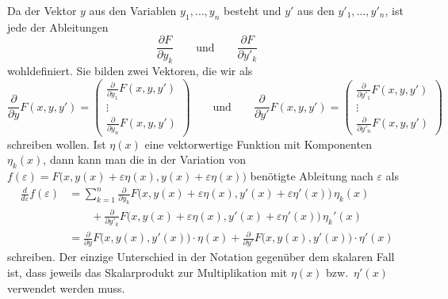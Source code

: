 Da der Vektor $y$ aus den Variablen $y_1,\dots,y_n$ besteht und $y'$
aus den $y'_1,\dots,y'_n$, ist jede der Ableitungen
\[
\frac{\partial F}{\partial y_k}
\qquad\text{und}\qquad
\frac{\partial F}{\partial y'_k}
\]
wohldefiniert.
Sie bilden zwei Vektoren, die wir als
\begin{equation}
\frac{\partial}{\partial y}
F(x,y,y')
=
\begin{pmatrix}
\displaystyle
\frac{\partial}{\partial y_1}F(x,y,y')\\
\vdots\\
\displaystyle
\frac{\partial}{\partial y_n}F(x,y,y')
\end{pmatrix}
\qquad\text{und}\qquad
\frac{\partial}{\partial y'} F(x,y,y')
=
\begin{pmatrix}
\displaystyle
\frac{\partial}{\partial y'_1}F(x,y,y')\\
\vdots\\
\displaystyle
\frac{\partial}{\partial y'_n}F(x,y,y')
\end{pmatrix}
\end{equation}
schreiben wollen.
Ist $\eta(x)$ eine vektorwertige Funktion mit Komponenten
$\eta_k(x)$, dann kann man die in der Variation von
$f(\varepsilon)
=
F\bigl(x,y(x)+\varepsilon\eta(x),y(x)+\varepsilon\eta(x)\bigr)$
benötigte Ableitung nach $\varepsilon$ als
\begin{align*}
\frac{d}{d\varepsilon}f(\varepsilon)
&=
\sum_{k=1}^n
\frac{\partial}{\partial y_k}
F\bigl(x,y(x)+\varepsilon\eta(x),y'(x)+\varepsilon\eta'(x)\bigr)
\,
\eta_k(x)
\\
&\qquad
+
\frac{\partial}{\partial y'_k}
F\bigl(x,y(x)+\varepsilon\eta(x),y'(x)+\varepsilon\eta'(x)\bigr)
\,
\eta_k'(x)
\\
&=
\frac{\partial}{\partial y}
F\bigl(x,y(x),y'(x)\bigr)\cdot \eta(x)
+
\frac{\partial}{\partial y'}
F\bigl(x,y(x),y'(x)\bigr)\cdot \eta'(x)
\end{align*}
schreiben.
Der einzige Unterschied in der Notation gegenüber dem skalaren Fall
ist, dass jeweils das Skalarprodukt zur Multiplikation mit $\eta(x)$
bzw.~$\eta'(x)$ verwendet werden muss.

%
%
